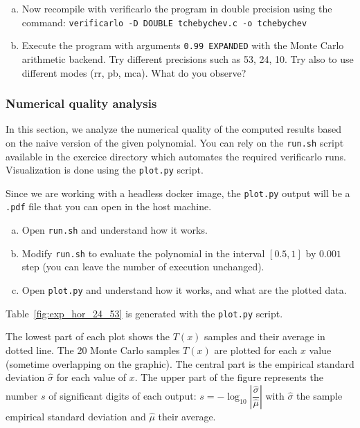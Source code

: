 \begin{question}
  \begin{enumerate}[(a)]
  \item Now recompile with verificarlo the program in double precision using the command:\newline
    {\tt verificarlo -D DOUBLE tchebychev.c -o tchebychev} \\
  \item Execute the program with arguments \texttt{0.99 EXPANDED} with the Monte Carlo arithmetic backend. Try different precisions such as 53, 24, 10. Try also to use different modes (rr, pb, mca). What do you observe?
  \end{enumerate}
\end{question}

\subsubsection{Numerical quality analysis}

 In this section, we analyze the numerical quality of the computed results based on the naive version of the given polynomial. 
You can rely on the \texttt{run.sh} script available in the exercice directory which automates the required verificarlo runs. 
Visualization is done using the \texttt{plot.py} script.

Since we are working with a headless docker image, the \texttt{plot.py} output
will be a \texttt{.pdf} file that you can open in the host machine.


\begin{question}
  \begin{enumerate}[(a)]
 \item Open {\tt run.sh} and understand how it works.
  \item Modify {\tt run.sh} to evaluate the polynomial in the interval $[0.5,1]$ by $0.001$ step (you can leave the number of execution unchanged).
  \item Open {\tt plot.py} and understand how it works, and what are the plotted data.
  \end{enumerate}
\end{question}

Table~\ref{fig:exp_hor_24_53} is generated with the \texttt{plot.py} script.

The lowest part of each plot shows the $T(x)$ samples and their average in dotted line. The 20 Monte Carlo samples $T(x)$ are plotted for each $x$ value (sometime overlapping on the graphic).
The central part is the empirical standard deviation $\hat\sigma$ for each value of $x$.
The upper part of the figure represents the number $s$ of significant digits of each output: $s=-\log_{10}\left|\dfrac{\hat\sigma}{\hat\mu}\right|$ with $\hat\sigma$ the sample empirical standard deviation and $\hat\mu$ their average.

